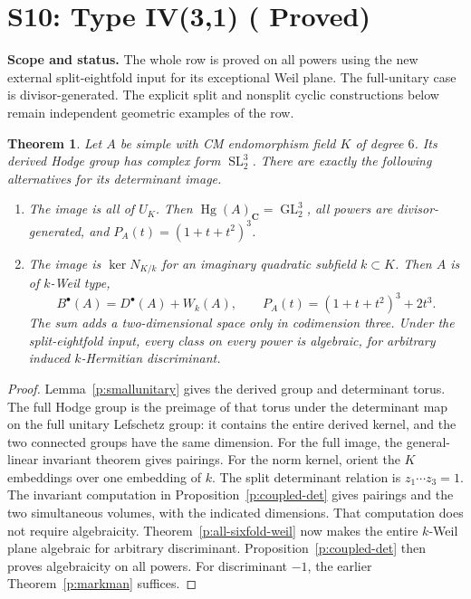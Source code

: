 \documentclass[10pt,reqno]{article}
\theoremstyle{emphasizedplain}
\DeclareRobustCommand{\provedstatus}{%
  \texorpdfstring{\textcolor{ProvedGreen}{\textbf{Proved}}}{Proved}}
\newtheorem{theorem}{Theorem}[section]
\theoremstyle{emphasizeddefinition}
\theoremstyle{emphasizeddefinition}
\DeclareMathOperator{\Hg}{Hg}
\DeclareMathOperator{\GL}{GL}
\DeclareMathOperator{\SL}{SL}
\newcommand{\C}{\mathbf C}
\newcommand{\status}[1]{%
  \par\nobreak\smallskip\noindent
  {\setlength{\fboxsep}{7pt}%
   \colorbox{ScopeBackground}{%
    \parbox{\dimexpr\linewidth-2\fboxsep\relax}{%
     \small\textbf{\textcolor{HeadingInk}{Scope and status.}} #1}}}%
  \par\nobreak\medskip}
\renewcommand{\small}{\fontsize{8.4}{10}\selectfont}
\begin{document}
\section{S10: Type IV(3,1) (\provedstatus)}\label{sec:S10}

\status{The whole row is proved on all powers using the new external
split-eightfold input for its exceptional Weil plane. The full-unitary
case is divisor-generated. The explicit split and nonsplit cyclic
constructions below remain independent geometric examples of the row.}
\begin{theorem}
Let $A$ be simple with CM endomorphism field $K$ of degree $6$.
Its derived Hodge group has complex form $\SL_{2}^{3}$.
There are exactly the following alternatives for its determinant image.
\begin{enumerate}
\item The image is all of $U_K$. Then $\Hg(A)_\C=\GL_{2}^{3}$,
all powers are divisor-generated, and $P_A(t)=(1+t+t^2)^3$.
\item The image is $\ker N_{K/k}$ for an imaginary quadratic subfield
$k\subset K$. Then $A$ is of $k$-Weil type,
\[
 B^\bullet(A)=D^\bullet(A)+W_k(A),\qquad
 P_A(t)=(1+t+t^2)^3+2t^3.
\]
The sum adds a two-dimensional space only in codimension three.
Under the split-eightfold input, every class on every power is
algebraic, for arbitrary induced $k$-Hermitian discriminant.
\end{enumerate}
\end{theorem}
\begin{proof}
Lemma~\ref{p:smallunitary} gives the derived group and determinant torus.
The full Hodge group is the preimage of that torus under the determinant
map on the full unitary Lefschetz group: it contains the entire derived
kernel, and the two connected groups have the same dimension.
For the full image, the general-linear invariant theorem gives pairings.
For the norm kernel, orient the $K$ embeddings over one embedding of $k$.
The split determinant relation is $z_1\cdots z_{3}=1$.
The invariant computation in Proposition~\ref{p:coupled-det} gives pairings
and the two simultaneous volumes, with the indicated dimensions. That
computation does not require algebraicity. Theorem~\ref{p:all-sixfold-weil}
now makes the entire $k$-Weil plane algebraic for arbitrary discriminant.
Proposition~\ref{p:coupled-det} then proves algebraicity on all powers.
For discriminant $-1$, the earlier Theorem~\ref{p:markman} suffices.
\end{proof}
\end{document}
